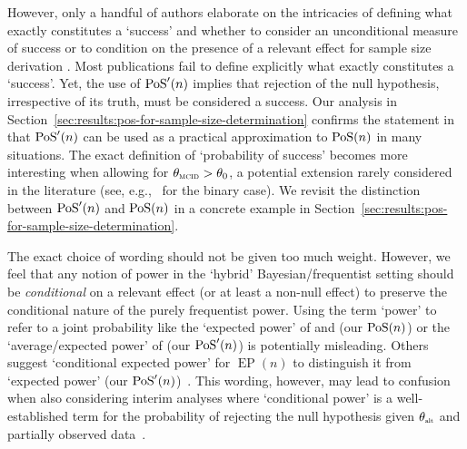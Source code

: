 \documentclass{article}
\newcommand{\EP}{\operatorname{EP}}
\begin{document}
However, only a handful of authors elaborate on the intricacies of defining what exactly constitutes a `success' and
whether to consider an unconditional measure of success or to condition on the presence of a relevant effect for sample size derivation \citep{spiegelhalter1986,brown1987projection,shao-2008,liu-2010,ciarleglio-2015}.
Most publications fail to define explicitly what exactly constitutes a `success'.
Yet, the use of $\operatorname{PoS}'(n)$ implies that rejection of the null hypothesis,
irrespective of its truth, must be considered a success.
Our analysis in Section~\ref{sec:results:pos-for-sample-size-determination}
confirms the statement in \citet{spiegelhalter-2004} that
$\operatorname{PoS}'(n)$ can be used as a practical approximation to
$\operatorname{PoS}(n)$ in many situations.
The exact definition of `probability of success' becomes more
interesting when allowing for $\mcid>\theta_0$,
a potential extension rarely considered in the literature
(see, e.g.,~\citet{brown1987projection} for the binary case).
We revisit the distinction between $\operatorname{PoS}'(n)$ and $\operatorname{PoS}(n)$
in a concrete example in Section~\ref{sec:results:pos-for-sample-size-determination}.

The exact choice of wording should not be given too much weight.
However, we feel that any notion of power in the `hybrid' Bayesian/frequentist setting should be \emph{conditional} on a relevant effect (or at least a non-null effect) to preserve the conditional nature of the purely frequentist power.
Using the term `power' to refer to a joint probability like
the `expected power' of
\citet{brown1987projection} and \citet{ciarleglio-2015} (our $\operatorname{PoS}(n)$) or
the `average/expected power' of
\citet{spiegelhalter-2004} (our $\operatorname{PoS}'(n)$) is potentially misleading.
Others suggest `conditional expected power' for $\EP(n)$ to distinguish it from `expected power' (our $\operatorname{PoS}'(n)$)~\citep{brown1987projection,ciarleglio-2015}.
This wording, however, may lead to confusion when also considering interim analyses where `conditional power' is a well-established term for the probability of rejecting the null hypothesis given $\altv$ and partially observed data~\citep{bauer-2016}.
\end{document}
